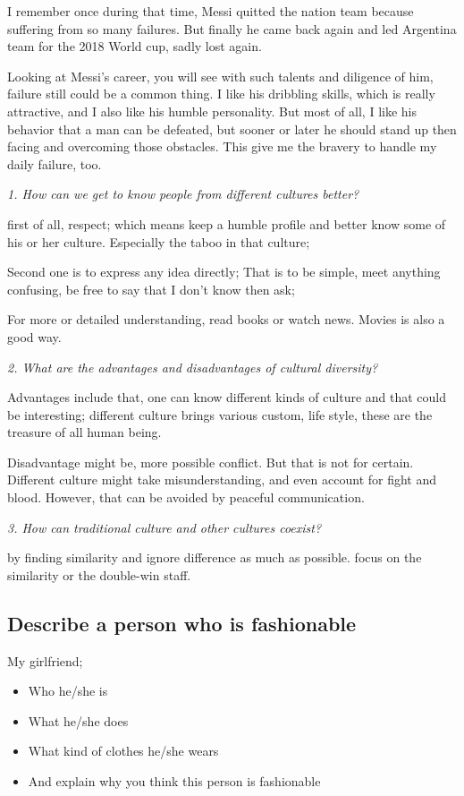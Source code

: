 \documentclass[conference]{IEEEtran}
\begin{document}
I remember once during that time, Messi quitted the nation team because suffering from so many failures.
But finally he came back again and led Argentina team for the 2018 World cup, sadly lost again.

Looking at Messi's career, you will see with such talents and diligence of him, failure still could
be a common thing. I like his dribbling skills, which is really attractive, and I also like his humble personality.
But most of all, I like his behavior that a man can be defeated, but sooner or later he should stand up
then facing and overcoming those obstacles.
This give me the bravery to handle my daily failure, too.

\textit{1. How can we get to know people from different cultures better?}

first of all, respect; which means keep a humble profile and better know some of his or her culture.
Especially the taboo in that culture;

Second one is to express any idea directly; That is to be simple, meet anything confusing, be free to say that
I don't know then ask;

For more or detailed understanding, read books or watch news. Movies is also a good way.

\textit{2. What are the advantages and disadvantages of cultural diversity?}

Advantages include that, one can know different kinds of culture and that could be interesting;
different culture brings various custom, life style, these are the treasure of all human being.

Disadvantage might be, more possible conflict.
But that is not for certain. Different culture might take misunderstanding, and even account for fight and blood.
However, that can be avoided by peaceful communication.   

\textit{3. How can traditional culture and other cultures coexist?}

by finding similarity and ignore difference as much as possible.
focus on the similarity or the double-win staff.


\subsection{Describe a person who is fashionable}
My girlfriend;

\begin{itemize}
    \item Who he/she is
    \item What he/she does
    \item What kind of clothes he/she wears
    \item And explain why you think this person is fashionable
\end{itemize}
\end{document}
